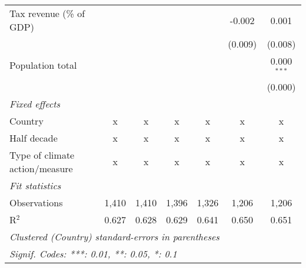 \begin{tabular}{lcccccc}
   Tax revenue (\% of GDP)                                 &         &         &              &         & -0.002  & 0.001\\   
                                                           &         &         &              &         & (0.009) & (0.008)\\   
   Population total                                        &         &         &              &         &         & 0.000$^{***}$\\   
                                                           &         &         &              &         &         & (0.000)\\   
   \emph{Fixed effects}\\
   Country                                                 & x       & x       & x            & x       & x       & x\\  
   Half decade                                             & x       & x       & x            & x       & x       & x\\  
   Type of climate action/measure                          & x       & x       & x            & x       & x       & x\\  
   \midrule \emph{Fit statistics}\\
   Observations                                            & 1,410   & 1,410   & 1,396        & 1,326   & 1,206   & 1,206\\  
   R$^2$                                                   & 0.627   & 0.628   & 0.629        & 0.641   & 0.650   & 0.651\\  
   \midrule
   \multicolumn{7}{l}{\emph{Clustered (Country) standard-errors in parentheses}}\\
   \multicolumn{7}{l}{\emph{Signif. Codes: ***: 0.01, **: 0.05, *: 0.1}}\\
\end{tabular}
\par\endgroup


